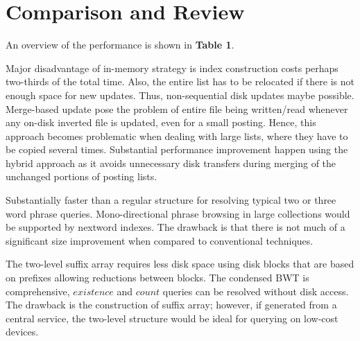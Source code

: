 \section{Comparison and Review}
\label{sec-somethingnew}

An overview of the performance is shown in \textbf {Table 1}. 

 Major disadvantage of in-memory strategy is index construction costs perhaps two-thirds of the total time. Also, the entire list has to be relocated if there is not enough space for new updates. Thus, non-sequential disk updates maybe possible. 
Merge-based update pose the problem of entire file being written/read whenever any on-disk inverted file is updated, even for a small posting.  Hence, this approach becomes problematic when dealing with large lists, where they have to be copied several times. Substantial performance improvement happen using the hybrid approach as it avoids unnecessary disk transfers during merging of the unchanged portions of posting lists. 
  
 Substantially faster than a regular structure for resolving typical two or three word phrase queries. Mono-directional phrase browsing in large collections would be supported by nextword indexes. The drawback is that there is not much of a significant size improvement when compared to conventional techniques. 
 
 The two-level suffix array requires less disk space using disk blocks that are based on prefixes allowing reductions between blocks. The condensed BWT is comprehensive, $existence$ and $count$ queries can be resolved without disk access. The drawback is the construction of suffix array; however, if generated from a central service, the two-level structure would be ideal for querying on low-cost devices.
 




